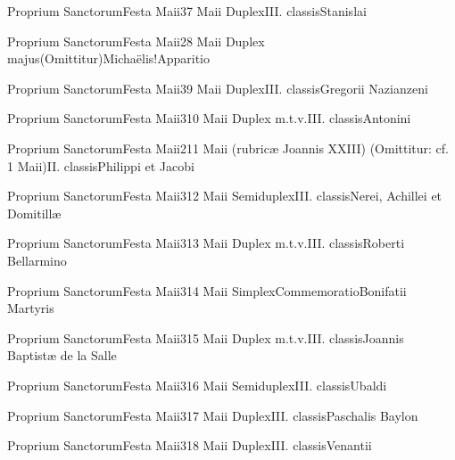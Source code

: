 \documentclass[psalterium-feriale.tex]{subfiles}
\begin{document}
	{Proprium Sanctorum}{Festa Maii}{3}{7 Maii}
	{Duplex}{III. classis}{Stanislai}
	{}
	{}
\UMTPRubric

	{Proprium Sanctorum}{Festa Maii}{2}{8 Maii}
	{Duplex majus}{(Omittitur)}{Michaëlis!Apparitio}
	{}
	{}
\psalmodiapropria

	{Proprium Sanctorum}{Festa Maii}{3}{9 Maii}
	{Duplex}{III. classis}{Gregorii Nazianzeni}
	{}
	{}
\COPOdRubric

	{Proprium Sanctorum}{Festa Maii}{3}{10 Maii}
	{Duplex m.t.v.}{III. classis}{Antonini}
	{}
	{}
\COPOdRubric

	{Proprium Sanctorum}{Festa Maii}{2}{11 Maii (rubricæ Joannis XXIII)}
	{(Omittitur: cf. 1 Maii)}{II. classis}{Philippi et Jacobi}
	{}
	{}
\psalmodiapropria

	{Proprium Sanctorum}{Festa Maii}{3}{12 Maii}
	{Semiduplex}{III. classis}{Nerei, Achillei et Domitillæ}
	{}
	{}
\PMTPRubric

	{Proprium Sanctorum}{Festa Maii}{3}{13 Maii}
	{Duplex m.t.v.}{III. classis}{Roberti Bellarmino}
	{}
	{}
\COPOdRubric

	{Proprium Sanctorum}{Festa Maii}{3}{14 Maii}
	{Simplex}{Commemoratio}{Bonifatii Martyris}
	{}
	{}
\UMTPRubric

	{Proprium Sanctorum}{Festa Maii}{3}{15 Maii}
	{Duplex m.t.v.}{III. classis}{Joannis Baptistæ de la Salle}
	{}
	{}
\COPOdRubric

	{Proprium Sanctorum}{Festa Maii}{3}{16 Maii}
	{Semiduplex}{III. classis}{Ubaldi}
	{}
	{}
\COPOdRubric

	{Proprium Sanctorum}{Festa Maii}{3}{17 Maii}
	{Duplex}{III. classis}{Paschalis Baylon}
	{}
	{}
\COPOdRubric

	{Proprium Sanctorum}{Festa Maii}{3}{18 Maii}
	{Duplex}{III. classis}{Venantii}
	{}
	{}
\end{document}
